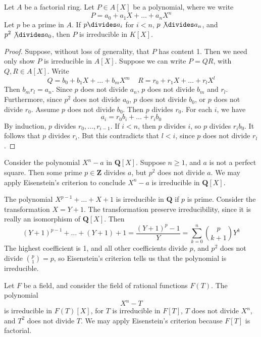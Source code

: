 \begin{theorem}[Eisenstein]
    Let $A$ be a factorial ring. Let $P \in A[X]$ be a polynomial, where we write
    \[ P = a_0 + a_1 X + \dots + a_n X^n \]
    Let $p$ be a prime in $A$. If $p \divides a_i$ for $i < n$, $p \not \divides a_n$, and $p^2 \not \divides a_0$, then $P$ is irreducible in $K[X]$.
\end{theorem}
\begin{proof}
    Suppose, without loss of generality, that $P$ has content 1. Then we need only show $P$ is irreducible in $A[X]$. Suppose we can write $P = QR$, with $Q, R \in A[X]$. Write
    \[ Q = b_0 + b_1 X + \dots + b_m X^m\ \ \ \ \ R = r_0 + r_1 X + \dots + r_l X^l \]
    Then $b_m r_l = a_n$. Since $p$ does not divide $a_n$, $p$ does not divide $b_m$ and $r_l$. Furthermore, since $p^2$ does not divide $a_0$, $p$ does not divide $b_0$, or $p$ does not divide $r_0$. Assume $p$ does not divide $b_0$. Then $p$ divides $r_0$. For each $i$, we have
    \[ a_i = r_0 b_i + \dots + r_i b_0 \]
    By induction, $p$ divides $r_0, \dots, r_{i-1}$. If $i < n$, then $p$ divides $i$, so $p$ divides $r_i b_0$. It follows that $p$ divides $r_i$. But this contradicts that $l < i$, since $p$ does not divide $r_l$.
\end{proof}

\begin{example}
    Consider the polynomial $X^n - a$ in $\mathbf{Q}[X]$. Suppose $n \geq 1$, and $a$ is not a perfect square. Then some prime $p \in \mathbf{Z}$ divides $a$, but $p^2$ does not divide $a$. We may apply Eisenstein's criterion to conclude $X^n - a$ is irreducible in $\mathbf{Q}[X]$.
\end{example}

\begin{example}
    The polynomial $X^{p-1} + \dots + X + 1$ is irreducible in $\mathbf{Q}$ if $p$ is prime. Consider the transformation $X = Y + 1$. The transformation preserve irreducibility, since it is really an isomorphism of $\mathbf{Q}[X]$. Then
    \[ (Y + 1)^{p-1} + \dots + (Y + 1) + 1 = \frac{(Y + 1)^p - 1}{Y} = \sum_{k = 0}^n \binom{p}{k+1} Y^k \]
    The highest coefficient is 1, and all other coefficients divide $p$, and $p^2$ does not divide $\binom{p}{1} = p$, so Eisenstein's criterion tells us that the polynomial is irreducible.
\end{example}

\begin{example}
    Let $F$ be a field, and consider the field of rational functions $F(T)$. The polynomial
    \[ X^n - T \]
    is irreducible in $F(T)[X]$, for $T$ is irreducible in $F[T]$, $T$ does not divide $X^n$, and $T^2$ does not divide $T$. We may apply Eisenstein's criterion because $F[T]$ is factorial.
\end{example}

